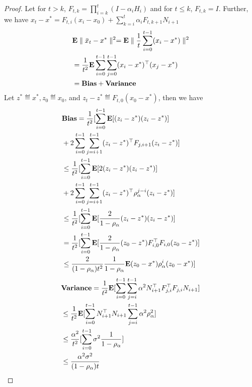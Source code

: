 \begin{proof}
Let for $t> k $, $F_{t,k}=\prod_{i=k}^t(I-\alpha_i H_i)$ and for $t\leq k$, $F_{t,k}=I$. Further, we have ${x}_t-x^*=F_{t,i} (x_i-x_0)+\sum_{k=i}^{t}\alpha_i F_{t,k+1}N_{i+1}$
\begin{align*}
&\mathbf{E}\parallel\bar{x}_t-x^*\parallel^2=\mathbf{E}\parallel\frac{1}{t}\sum_{i=0}^{t-1} (x_i-x^*)\parallel^2\\
&=\frac{1}{t^2}\mathbf{E}\sum_{i=0}^{t-1} \sum_{j=0}^{t-1}(x_i-x^*)^\top(x_j-x^*)\\
&=\textbf{Bias}+\textbf{Variance}
\end{align*}
Let $z^*\eqdef x^*, z_0\eqdef x_0$, and $z_t-z^*\eqdef F_{t,0}(x_0-x^*)$, then we have
\begin{align*}
&\textbf{Bias}=\frac{1}{t^2}[\sum_{i=0}^{t-1}\mathbf{E}[(z_i-z^*) (z_i-z^*)]\\&+2\sum_{i=0}^{t-1}\sum_{j=i+1}^{t-1}(z_i-z^*)^\top F_{j,i+1} (z_i-z^*)]\\
&\leq \frac{1}{t^2}[\sum_{i=0}^{t-1}\mathbf{E}[2(z_i-z^*)(z_i-z^*)]\\&+2\sum_{i=0}^{t-1}\sum_{j=i+1}^{t-1}(z_i-z^*)^\top \rho_\alpha^{j-i} (z_i-z^*)]\\
&\leq \frac{1}{t^2}[\sum_{i=0}^{t-1}\mathbf{E}[\frac{2}{1-\rho_\alpha}(z_i-z^*)(z_i-z^*)]\\
&=\frac{1}{t^2}[\sum_{i=0}^{t-1}\mathbf{E}[\frac{2}{1-\rho_\alpha}(z_0-z^*)F^\top_{i,0}F_{i,0}(z_0-z^*)]\\
&\leq \frac{2}{(1-\rho_{\alpha})t^2}\frac{1}{1-\rho_\alpha}\mathbf{E}(z_0-x^*)\rho_\alpha^i(z_0-x^*)]\\
\end{align*}
\begin{align*}
&\textbf{Variance}=\frac{1}{t^2}\mathbf{E}[\sum_{i=0}^{t-1}\sum_{j=i}^{t-1} \alpha^2 N^\top_{i+1}F^\top_{j,i} F_{j,i} N_{i+1}]\\
&\leq \frac{1}{t^2}\mathbf{E}[\sum_{i=0}^{t-1}N_{i+1}^\top N_{i+1}\sum_{j=i}^{t-1} \alpha^2 \rho_{\alpha}^2]\\
&\leq \frac{\alpha^2}{t^2}[\sum_{i=0}^{t-1}\sigma^2 \frac{1}{1-\rho_{\alpha}}]\\
&\leq \frac{\alpha^2\sigma^2}{(1-\rho_\alpha)t}
\end{align*}

\end{proof}
